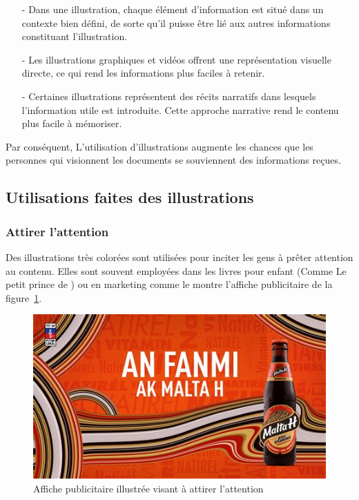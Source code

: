 \begin{itemize}
	\item[-] Dans une illustration, chaque \'el\'ement d'information est situ\'e dans un contexte bien d\'efini, de sorte qu'il puisse \^etre li\'e aux autres informations constituant l'illustration. \cite{ContextDependencyEffect}
	\item[-] Les illustrations graphiques et vid\'eos offrent une repr\'esentation visuelle directe, ce qui rend les informations plus faciles \`a retenir. \cite{ImageMemoire} \cite{ImageMemoireb}
	\item[-] Certaines illustrations repr\'esentent des r\'ecits narratifs dans lesquels l'information utile est introduite. Cette approche narrative rend le contenu plus facile \`a m\'emoriser.\cite{NarrationMemoire}
\end{itemize}
Par cons\'equent, L'utilisation d'illustrations augmente les chances que les personnes qui visionnent les documents se souviennent des informations re\c{c}ues.


\subsection{Utilisations faites des illustrations}


\subsubsection{Attirer l'attention}
Des illustrations tr\`es color\'ees sont utilis\'ees pour inciter les gens \`a pr\^eter attention au contenu. Elles sont souvent employ\'ees dans les livres pour enfant (Comme Le petit prince de \cite{LePetitPrince}) ou en marketing comme le montre l'affiche publicitaire de la figure~\ref{FigMaltaH}.



\begin{figure}[ht]
	\centering
	\includegraphics[width=0.50\linewidth]{Pictures/MaltaH.jpg}
	\caption{Affiche publicitaire illustr\'ee visant \`a attirer l'attention}
	\label{FigMaltaH}
\end{figure}



